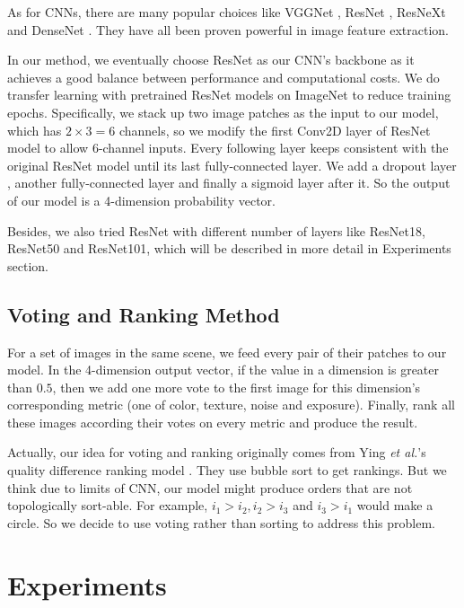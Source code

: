 \documentclass[journal]{IEEEtran}
\begin{document}
As for CNNs, there are many popular choices like VGGNet \cite{simonyan2014very}, ResNet \cite{he2016deep}, ResNeXt \cite{Xie2016} and DenseNet \cite{huang2017densely}. They have all been proven powerful in image feature extraction.

In our method, we eventually choose ResNet as our CNN's backbone as it achieves a good balance between performance and computational costs. We do transfer learning \cite{pan2009survey} with pretrained ResNet models on ImageNet \cite{deng2009imagenet} to reduce training epochs. Specifically, we stack up two image patches as the input to our model, which has $2 \times 3 = 6$ channels, so we modify the first Conv2D layer of ResNet model to allow 6-channel inputs. Every following layer keeps consistent with the original ResNet model until its last fully-connected layer. We add a dropout layer \cite{srivastava2014dropout}, another fully-connected layer and finally a sigmoid layer after it. So the output of our model is a 4-dimension probability vector.

Besides, we also tried ResNet with different number of layers like ResNet18, ResNet50 and ResNet101, which will be described in more detail in Experiments section.

\subsection{Voting and Ranking Method}

For a set of images in the same scene, we feed every pair of their patches to our model. In the 4-dimension output vector, if the value in a dimension is greater than $0.5$, then we add one more vote to the first image for this dimension's corresponding metric (one of color, texture, noise and exposure). Finally, rank all these images according their votes on every metric and produce the result.

Actually, our idea for voting and ranking originally comes from Ying \textit{et al.}'s quality difference ranking model \cite{ying2020quality}. They use bubble sort to get rankings. But we think due to limits of CNN, our model might produce orders that are not topologically sort-able. For example, $i_1 > i_2, i_2 > i_3$ and $i_3 > i_1$ would make a circle. So we decide to use voting rather than sorting to address this problem.

\section{Experiments}
\end{document}
